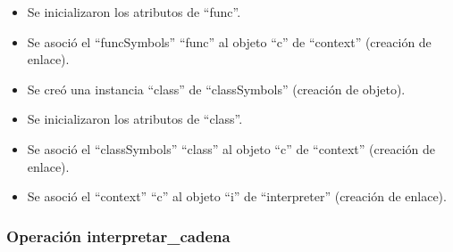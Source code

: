 \begin{description}
\begin {itemize}
         \item Se inicializaron los atributos de ``func''.
         \item Se asoció el ``funcSymbols'' ``func'' al objeto ``c'' de ``context'' (creación de enlace).
         \item Se creó una instancia ``class'' de ``classSymbols'' (creación de objeto).
         \item Se inicializaron los atributos de ``class''.
         \item Se asoció el ``classSymbols'' ``class'' al objeto ``c'' de ``context'' (creación de enlace).
         \item Se asoció el ``context'' ``c'' al objeto ``i'' de ``interpreter'' (creación de enlace).
      \end{itemize}
	\end{description}


\subsubsection{Operación interpretar\_cadena}

